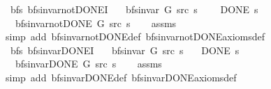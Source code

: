 \begin{isabellebody}
\ {\isacharparenleft}{\kern0pt}\ bfs{\isacharparenright}{\kern0pt}\ bfs{\isacharunderscore}{\kern0pt}invar{\isacharunderscore}{\kern0pt}not{\isacharunderscore}{\kern0pt}DONE{\isacharprime}{\kern0pt}I{\isacharcolon}{\kern0pt}\isanewline
\ \ \ {\isachardoublequoteopen}bfs{\isacharunderscore}{\kern0pt}invar{\isacharprime}{\kern0pt}\ G\ src\ s{\isachardoublequoteclose}\isanewline
\ \ \ {\isachardoublequoteopen}{\isasymnot}\ DONE\ s{\isachardoublequoteclose}\isanewline
\ \ \ {\isachardoublequoteopen}bfs{\isacharunderscore}{\kern0pt}invar{\isacharunderscore}{\kern0pt}not{\isacharunderscore}{\kern0pt}DONE{\isacharprime}{\kern0pt}\ G\ src\ s{\isachardoublequoteclose}%
\endisataginvisible
{\isafoldinvisible}%
%
\isadeliminvisible
\isanewline
%
\endisadeliminvisible
%
\isadelimproof
\ \ %
\endisadelimproof
%
\isatagproof
{}\isamarkupfalse%
\ assms\isanewline
\ \ \isamarkupfalse%
\ {\isacharparenleft}{\kern0pt}simp\ add{\isacharcolon}{\kern0pt}\ bfs{\isacharunderscore}{\kern0pt}invar{\isacharunderscore}{\kern0pt}not{\isacharunderscore}{\kern0pt}DONE{\isacharunderscore}{\kern0pt}def\ bfs{\isacharunderscore}{\kern0pt}invar{\isacharunderscore}{\kern0pt}not{\isacharunderscore}{\kern0pt}DONE{\isacharunderscore}{\kern0pt}axioms{\isacharunderscore}{\kern0pt}def{\isacharparenright}{\kern0pt}%
\endisatagproof
{\isafoldproof}%
%
\isadelimproof
\isanewline
%
\endisadelimproof
%
\isadeliminvisible
\isanewline
%
\endisadeliminvisible
%
\isataginvisible
{}\isamarkupfalse%
\ {\isacharparenleft}{\kern0pt}\ bfs{\isacharparenright}{\kern0pt}\ bfs{\isacharunderscore}{\kern0pt}invar{\isacharunderscore}{\kern0pt}DONE{\isacharprime}{\kern0pt}I{\isacharcolon}{\kern0pt}\isanewline
\ \ \ {\isachardoublequoteopen}bfs{\isacharunderscore}{\kern0pt}invar{\isacharprime}{\kern0pt}\ G\ src\ s{\isachardoublequoteclose}\isanewline
\ \ \ {\isachardoublequoteopen}DONE\ s{\isachardoublequoteclose}\isanewline
\ \ \ {\isachardoublequoteopen}bfs{\isacharunderscore}{\kern0pt}invar{\isacharunderscore}{\kern0pt}DONE{\isacharprime}{\kern0pt}\ G\ src\ s{\isachardoublequoteclose}%
\endisataginvisible
{\isafoldinvisible}%
%
\isadeliminvisible
\isanewline
%
\endisadeliminvisible
%
\isadelimproof
\ \ %
\endisadelimproof
%
\isatagproof
{}\isamarkupfalse%
\ assms\isanewline
\ \ \isamarkupfalse%
\ {\isacharparenleft}{\kern0pt}simp\ add{\isacharcolon}{\kern0pt}\ bfs{\isacharunderscore}{\kern0pt}invar{\isacharunderscore}{\kern0pt}DONE{\isacharunderscore}{\kern0pt}def\ bfs{\isacharunderscore}{\kern0pt}invar{\isacharunderscore}{\kern0pt}DONE{\isacharunderscore}{\kern0pt}axioms{\isacharunderscore}{\kern0pt}def{\isacharparenright}{\kern0pt}%

\end{isabellebody}
